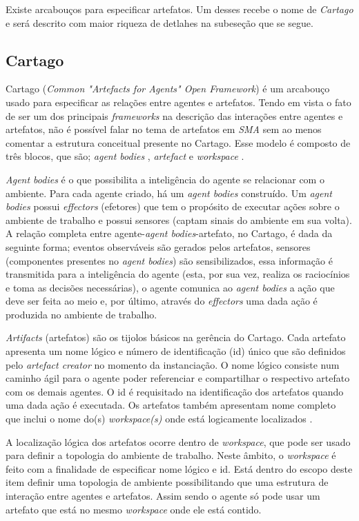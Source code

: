 Existe arcabouços para especificar artefatos. Um desses recebe o nome de \textit{Cartago} e será descrito com maior riqueza de detlahes na subeseção que se segue.
 
 \subsection{Cartago}

Cartago (\textit{Common "Artefacts for Agents" Open Framework}) é um arcabouço usado para especificar as relações entre agentes e artefatos. Tendo em vista o fato de ser um dos principais \textit{frameworks} na descrição das interações entre agentes e artefatos, não é possível falar no tema de artefatos em \textit{SMA} sem ao menos comentar a estrutura conceitual presente no Cartago. Esse modelo é composto de três blocos, que são; \textit{agent bodies} , \textit{artefact} e \textit{workspace} \cite{cartago}.

 \textit{Agent bodies} é  o que possibilita a inteligência do agente se relacionar com o ambiente. Para cada agente criado, há um \textit{agent bodies} construído. Um \textit{agent bodies} possui \textit{effectors} (efetores) que tem o propósito de executar ações sobre o ambiente de trabalho e possui sensores (captam sinais do ambiente em sua volta). A relação completa entre agente-\textit{agent bodies}-artefato, no Cartago, é dada da seguinte forma; eventos observáveis são gerados pelos artefatos, sensores (componentes presentes no \textit{agent bodies}) são sensibilizados, essa informação é transmitida para a inteligência do  agente (esta, por sua vez, realiza os raciocínios e toma as  decisões necessárias), o agente comunica ao \textit{agent bodies} a ação que deve ser feita ao 
 meio e, por último, através do \textit{effectors} uma dada ação é produzida no ambiente de trabalho. 

 \textit{Artifacts} (artefatos) são os tijolos básicos na gerência do Cartago. Cada artefato apresenta um nome lógico e número de identificação (id) único que são definidos pelo \textit{artefact creator} no momento da instanciação. O nome lógico consiste num caminho ágil para o agente poder referenciar  e compartilhar o respectivo artefato com os demais agentes. O id é requisitado na identificação dos artefatos quando uma dada ação é executada. Os artefatos também apresentam nome completo que inclui o nome do(s) \textit{workspace(s)} onde está logicamente localizados \cite{cartago}.

 A localização lógica dos artefatos ocorre dentro de \textit{workspace}, que pode ser usado para definir a topologia do ambiente de trabalho. Neste âmbito, o \textit{workspace} é feito com a finalidade de especificar nome lógico e id. Está dentro do escopo deste item definir uma topologia de ambiente possibilitando que uma estrutura de interação entre agentes e artefatos. Assim sendo o agente só pode usar um artefato que está no mesmo \textit{workspace} onde ele está contido. 